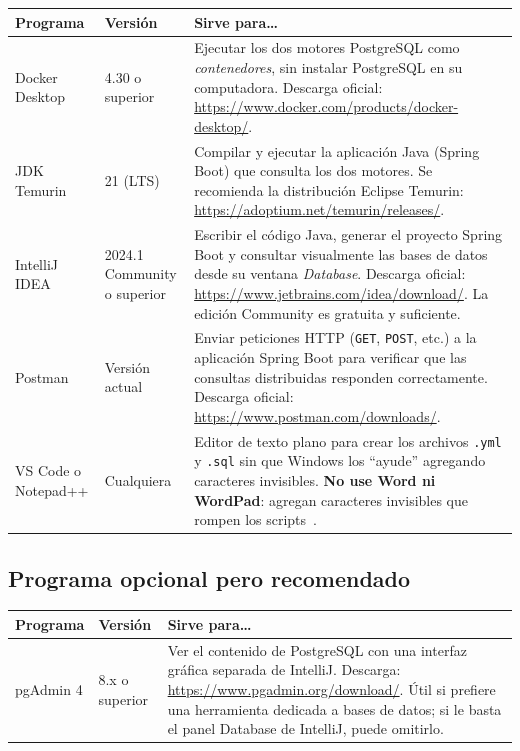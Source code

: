 \documentclass[11pt,a4paper]{article}
\begin{document}
\begin{xltabular}{\textwidth}{@{}p{3.2cm}p{4cm}X@{}}
\toprule
\textbf{Programa} & \textbf{Versi\'on} & \textbf{Sirve para\ldots} \\
\midrule
Docker Desktop & 4.30 o superior & Ejecutar los dos motores PostgreSQL como \emph{contenedores}, sin instalar PostgreSQL en su computadora. Descarga oficial: \url{https://www.docker.com/products/docker-desktop/}. \\
\midrule
JDK Temurin & 21 (LTS) & Compilar y ejecutar la aplicaci\'on Java (Spring Boot) que consulta los dos motores. Se recomienda la distribuci\'on Eclipse Temurin: \url{https://adoptium.net/temurin/releases/}. \\
\midrule
IntelliJ IDEA & 2024.1 Community o superior & Escribir el c\'odigo Java, generar el proyecto Spring Boot y consultar visualmente las bases de datos desde su ventana \emph{Database}. Descarga oficial: \url{https://www.jetbrains.com/idea/download/}. La edici\'on Community es gratuita y suficiente. \\
\midrule
Postman & Versi\'on actual & Enviar peticiones HTTP (\texttt{GET}, \texttt{POST}, etc.) a la aplicaci\'on Spring Boot para verificar que las consultas distribuidas responden correctamente. Descarga oficial: \url{https://www.postman.com/downloads/}. \\
\midrule
VS Code o Notepad++ & Cualquiera & Editor de texto plano para crear los archivos \texttt{.yml} y \texttt{.sql} sin que Windows los ``ayude'' agregando caracteres invisibles. \textbf{No use Word ni WordPad}: agregan caracteres invisibles que rompen los scripts~\cite{PostgreSQL16Docs}. \\
\bottomrule
\end{xltabular}

\subsection{Programa opcional pero recomendado}

\begin{xltabular}{\textwidth}{@{}p{3.2cm}p{4cm}X@{}}
\toprule
\textbf{Programa} & \textbf{Versi\'on} & \textbf{Sirve para\ldots} \\
\midrule
pgAdmin 4 & 8.x o superior & Ver el contenido de PostgreSQL con una interfaz gr\'afica separada de IntelliJ. Descarga: \url{https://www.pgadmin.org/download/}. \'Util si prefiere una herramienta dedicada a bases de datos; si le basta el panel Database de IntelliJ, puede omitirlo. \\
\bottomrule
\end{xltabular}
\end{document}

